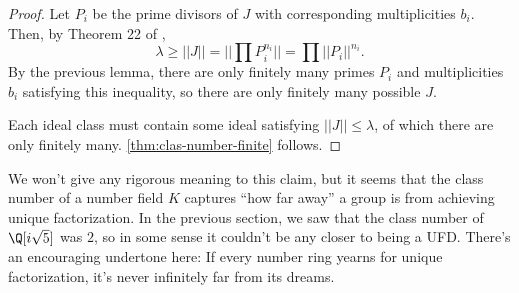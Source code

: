 \begin{proof}
    Let $P_i$ be the prime divisors of $J$ with corresponding multiplicities $b_i$.
    Then, by Theorem 22 of \textcite{marcus},
    \begin{equation}
        \lambda
        \geq ||J||
        = ||\prod P_i^{n_i}||
        = \prod ||P_i||^{n_i}.
    \end{equation}
    By the previous lemma, there are only finitely many primes $P_i$ and multiplicities $b_i$ satisfying this inequality, so there are only finitely many possible $J$.

    \medskip

    Each ideal class must contain some ideal satisfying $||J|| \leq \lambda$, of which there are only finitely many. \autoref{thm:clas-number-finite} follows.
\end{proof}

We won't give any rigorous meaning to this claim, but it seems that the class number of a number field $K$ captures ``how far away'' a group is from achieving unique factorization.
In the previous section, we saw that the class number of $\Q[i \sqrt5]$ was $2$, so in some sense it couldn't be any closer to being a UFD. There's an encouraging undertone here: If every number ring yearns for unique factorization, it's never infinitely far from its dreams.

